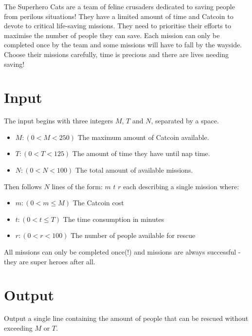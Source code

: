 
The Superhero Cats are a team of feline crusaders dedicated to saving people from perilous situations! They have a limited amount of time and Catcoin to devote to critical life-saving missions. They need to prioritise their efforts to maximise the number of people they can save. Each mission can only be completed once by the team and some missions will have to fall by the wayside. Choose their missions carefully, time is precious and there are lives needing saving!

\section*{Input}

The input begins with three integers $M$, $T$ and $N$, separated by a space.
\begin{itemize}
    \item {$M: (0 < M < 250)$ The maximum amount of Catcoin available.}
    \item {$T: (0 < T < 125)$ The amount of time they have until nap time.}
    \item {$N: (0 < N < 100)$ The total amount of available missions.}
\end{itemize}

Then follows $N$ lines of the form: $m$ $t$ $r$ each describing a single mission where:
\begin{itemize}
    \item {$m: (0 < m \le M)$ The Catcoin cost}
    \item {$t: (0 < t \le T)$ The time consumption in minutes}
    \item {$r: (0 < r < 100)$ The number of people available for rescue}
\end{itemize}

All missions can only be completed once(!) and missions are always successful - they are super heroes after all.

\section*{Output}

Output a single line containing the amount of people that can be rescued without exceeding $M$ or $T$.